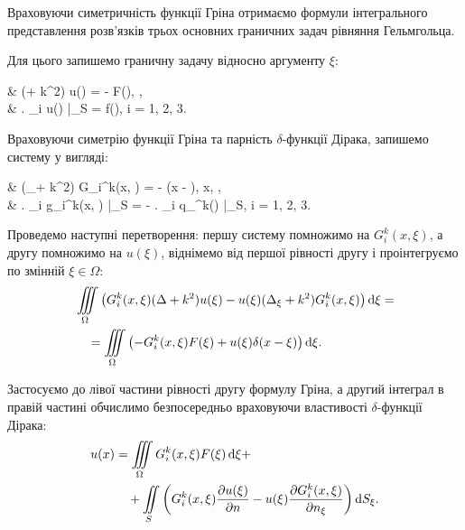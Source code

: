 Враховуючи симетричність функції Гріна отримаємо формули інтегрального представлення розв'язків трьох основних граничних задач рівняння Гельмгольца. \medskip

Для цього запишемо граничну задачу відносно аргументу $\xi$:
\begin{system}
	& (\Delta + k^2) u(\xi) = - F(\xi), \quad \xi \in \Omega, \\
	& \left. \ell_i u(\xi) \right|_{\xi \in S} = f(\xi), \quad i = 1, 2, 3.
\end{system}

Враховуючи симетрію функції Гріна та парність $\delta$-функції Дірака, запишемо систему у вигляді:
\begin{system}
	& (\Delta_\xi + k^2) G_i^k(x, \xi) = - \delta(x - \xi), \quad x, \xi \in \Omega, \\
	& \left. \ell_i g_i^k(x, \xi) \right|_{\xi \in S} = - \left. \ell_i q_\pm^k(\xi) \right|_{\xi \in S}, \quad i = 1, 2, 3.
\end{system}

Проведемо наступні перетворення: першу систему помножимо на $G_i^k(x, \xi)$, а другу помножимо на $u(\xi)$, віднімемо від першої рівності другу і проінтегруємо по змінній $\xi \in \Omega$:
\begin{equation}
	\begin{aligned}
		& \displaystyle\iiint\limits_\Omega \left( G_i^k(x, \xi) (\Delta + k^2) u(\xi) - u(\xi) (\Delta_\xi + k^2) G_i^k(x, \xi) \right) \mathop{}\!\mathrm{d} \xi = \\
		& \quad = \displaystyle\iiint\limits_\Omega \left( - G_i^k(x, \xi) F(\xi) + u(\xi) \delta(x - \xi) \right) \mathop{}\!\mathrm{d} \xi.
	\end{aligned}
\end{equation}


Застосуємо до лівої частини рівності другу формулу Гріна, а другий інтеграл в правій частині обчислимо безпосередньо враховуючи властивості $\delta$-функції Дірака:
\begin{equation}
	\begin{aligned}
		u(x) & = \displaystyle\iiint\limits_\Omega G_i^k(x, \xi) F(\xi) \mathop{}\!\mathrm{d} \xi + \\
		& \quad + \displaystyle\iint\limits_S \left( G_i^k(x, \xi) \frac{\partial u(\xi)}{\partial n} - u(\xi) \frac{\partial G_i^k(x, \xi)}{\partial n_\xi} \right) \mathop{}\!\mathrm{d} S_\xi.
	\end{aligned}
\end{equation}

